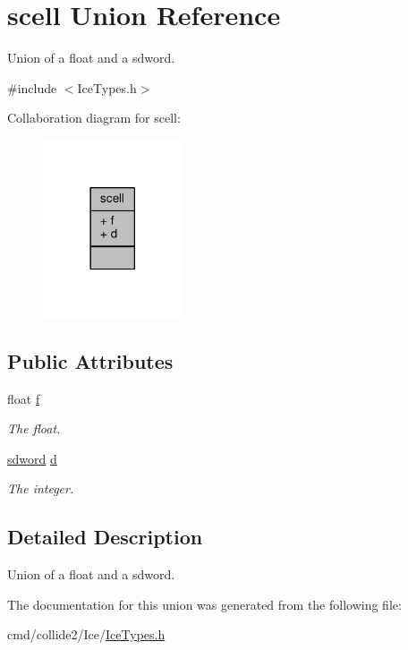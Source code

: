 \hypertarget{unionscell}{}\section{scell Union Reference}
\label{unionscell}


Union of a float and a sdword.  




{\ttfamily \#include $<$Ice\+Types.\+h$>$}



Collaboration diagram for scell\+:
\nopagebreak
\begin{figure}[H]
\begin{center}
\leavevmode
\includegraphics[width=117pt]{dc/dca/unionscell__coll__graph}
\end{center}
\end{figure}
\subsection*{Public Attributes}
\begin{DoxyCompactItemize}
\item 
float \hyperlink{unionscell_ae396f3517cb7c4d854fb324d413a7c5b}{f}\hypertarget{unionscell_ae396f3517cb7c4d854fb324d413a7c5b}{}\label{unionscell_ae396f3517cb7c4d854fb324d413a7c5b}

\begin{DoxyCompactList}\small\item\em The float. \end{DoxyCompactList}\item 
\hyperlink{IceTypes_8h_a1459338e4e102e56fead3b10918f15dd}{sdword} \hyperlink{unionscell_a31bdee18ad9fde62940f786210a74725}{d}\hypertarget{unionscell_a31bdee18ad9fde62940f786210a74725}{}\label{unionscell_a31bdee18ad9fde62940f786210a74725}

\begin{DoxyCompactList}\small\item\em The integer. \end{DoxyCompactList}\end{DoxyCompactItemize}


\subsection{Detailed Description}
Union of a float and a sdword. 

The documentation for this union was generated from the following file\+:\begin{DoxyCompactItemize}
\item 
cmd/collide2/\+Ice/\hyperlink{IceTypes_8h}{Ice\+Types.\+h}\end{DoxyCompactItemize}

